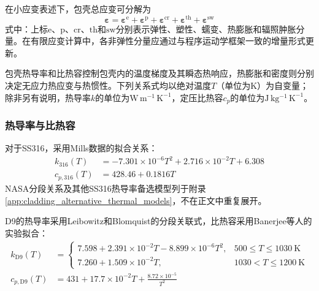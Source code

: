 在小应变表述下，包壳总应变可分解为
\begin{equation}
	\boldsymbol{\varepsilon}
	=\boldsymbol{\varepsilon}^{\mathrm e}
	+\boldsymbol{\varepsilon}^{\mathrm p}
	+\boldsymbol{\varepsilon}^{\mathrm{cr}}
	+\boldsymbol{\varepsilon}^{\mathrm{th}}
	+\boldsymbol{\varepsilon}^{\mathrm{sw}}
	\label{eq:clad_total_strain_decomposition}
\end{equation}
式中：上标$\mathrm e$、$\mathrm p$、$\mathrm{cr}$、$\mathrm{th}$和$\mathrm{sw}$分别表示弹性、塑性、蠕变、热膨胀和辐照肿胀分量。在有限应变计算中，各非弹性分量应通过与程序运动学框架一致的增量形式更新。

\label{sec:cladding_thermophysical_properties}

包壳热导率和比热容控制包壳内的温度梯度及其瞬态热响应，热膨胀和密度则分别决定无应力热应变与热惯性。下列关系式均以绝对温度$T$（单位为$\mathrm{K}$）为自变量；除非另有说明，热导率$k$的单位为$\mathrm{W\,m^{-1}\,K^{-1}}$，定压比热容$c_p$的单位为$\mathrm{J\,kg^{-1}\,K^{-1}}$。

\subsubsection{热导率与比热容}

对于SS316，采用Mills数据的拟合关系\cite{mills2002,halesBISONTheoryManual2016}：
\begin{subequations}\label{eq:ss316_thermal_properties}
	\begin{align}
		k_{316}(T)
		&=-7.301\times10^{-6}T^2
		+2.716\times10^{-2}T+6.308
		\label{eq:ss316_thermal_conductivity}\\
		c_{p,316}(T)
		&=428.46+0.1816T
		\label{eq:ss316_specific_heat}
	\end{align}
\end{subequations}
NASA分段关系及其他SS316热导率备选模型列于附录\ref{app:cladding_alternative_thermal_models}，不在正文中重复展开。

D9的热导率采用Leibowitz和Blomquist的分段关联式，比热容采用Banerjee等人的实验拟合\cite{Leibowitz_1988,banerjee2007_d9cp}：
\begin{subequations}\label{eq:d9_thermal_properties}
	\begin{align}
		k_{\mathrm{D9}}(T)
		&=
		\begin{cases}
			7.598+2.391\times10^{-2}T-8.899\times10^{-6}T^2,
			&500\leq T\leq1030\ \mathrm{K}\\
			7.260+1.509\times10^{-2}T,
			&1030<T\leq1200\ \mathrm{K}
		\end{cases}
		\label{eq:d9_thermal_conductivity}\\
		c_{p,\mathrm{D9}}(T)
		&=431+17.7\times10^{-2}T
		+\frac{8.72\times10^{-5}}{T^2}
		\label{eq:d9_specific_heat}
	\end{align}
\end{subequations}

